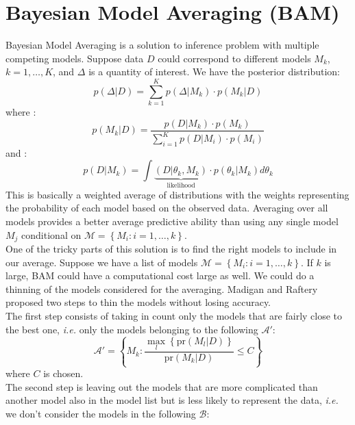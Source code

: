 \section{Bayesian Model Averaging (BAM)}
Bayesian Model Averaging is a solution to inference problem with multiple competing models. Suppose data $D$ could correspond to different models $M_k$, $k = 1, \dots, K$, and $\Delta$ is a quantity of interest. We have the posterior distribution:
\begin{equation}
p(\Delta|D) = \sum_{k=1}^K p(\Delta|M_k)\cdot p(M_k|D)
\label{eq:prior_Delta}
\end{equation}
where :
\begin{equation}
p(M_k|D) = \frac{p(D|M_k)\cdot p(M_k)}{\sum_{i=1}^Kp(D|M_i)\cdot p(M_i)}
\end{equation}
and :
\begin{equation}
p(D|M_k) = \int \underbrace{(D|\theta_k,M_k)}_{\text{likelihood}} \cdot p(\theta_k|M_k)d\theta_k
\end{equation}
\newline
This is basically a weighted average of distributions with the weights representing the probability of each model based on the observed data. Averaging over all models provides a better average predictive ability than using any single model $M_j$ conditional on $\mathcal{M} = \left\lbrace M_i : i = 1, \dots , k\right\rbrace$.\\
\newline
One of the tricky parts of this solution is to find the right models to include in our average. Suppose we have a list of models $\mathcal{M} = \left\lbrace M_i : i = 1, \dots , k\right\rbrace$. If $k$ is large, BAM could have a computational cost large as well. We could do a thinning of the models considered for the averaging. Madigan and Raftery proposed two steps to thin the models without losing accuracy.\\
The first step consists of taking in count only the models that are fairly close to the best one, \textit{i.e.} only the models belonging to the following $\mathcal{A}'$:
\begin{equation}
\mathcal{A}' = \left\lbrace M_k:\frac{\max_l\left\lbrace\text{pr}(M_l|D)\right\rbrace}{\text{pr}(M_k|D)}\leq C\right\rbrace
\label{eq:occam_1}
\end{equation}
where $C$ is chosen.\\
\newline
The second step is leaving out the models that are more complicated than another model also in the model list but is less likely to represent the data, \textit{i.e.} we don't consider the models in the following $\mathcal{B}$:
